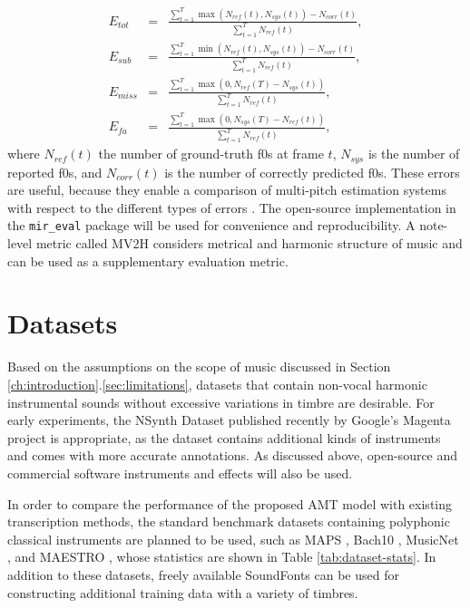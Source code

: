 \begin{eqnarray}
E_{tot} & = & \frac{\sum_{t=1}^T \max ( N_{ref}(t), N_{sys}(t) ) - N_{corr}(t)}{\sum_{t=1}^T N_{ref}(t)}, \\
E_{sub} & = & \frac{\sum_{t=1}^T \min ( N_{ref}(t), N_{sys}(t) ) - N_{corr}(t)}{\sum_{t=1}^T N_{ref}(t)}, \\
E_{miss} & = & \frac{\sum_{t=1}^T \max ( 0, N_{ref}(T) - N_{sys}(t) )}{\sum_{t=1}^T N_{ref}(t)}, \\
E_{fa} & = &  \frac{\sum_{t=1}^T \max ( 0, N_{sys}(T) - N_{ref}(t) )}{\sum_{t=1}^T N_{ref}(t)},
\end{eqnarray}
where $N_{ref}(t)$ the number of ground-truth f0s at frame $t$, $N_{sys}$ is the number of reported f0s, and $N_{corr}(t)$ is the number of correctly predicted f0s.
These errors are useful, because they enable a comparison of multi-pitch estimation systems with respect to the different types of errors \cite{bay2009evaluation}.
The open-source implementation in the \texttt{mir\_eval} package \cite{raffel2014mir_eval} will be used for convenience and reproducibility.
A note-level metric called MV2H \cite{mcleod2018eval} considers metrical and harmonic structure of music and can be used as a supplementary evaluation metric.





\section{Datasets}

Based on the assumptions on the scope of music discussed in Section \ref{ch:introduction}.\ref{sec:limitations}, datasets that contain non-vocal harmonic instrumental sounds without excessive variations in timbre are desirable.
For early experiments, the NSynth Dataset published recently by Google's Magenta project \cite{engel2017nsynth} is appropriate, as the dataset contains additional kinds of instruments and comes with more accurate annotations.
As discussed above, open-source and commercial software instruments and effects will also be used.

In order to compare the performance of the proposed AMT model with existing transcription methods, the standard benchmark datasets containing polyphonic classical instruments are planned to be used, such as MAPS \cite{emiya2010smoothness}, Bach10 \cite{duan2010bach10}, MusicNet \cite{thickstun2017musicnet}, and MAESTRO \cite{hawthorne2018maestro}, whose statistics are shown in Table \ref{tab:dataset-stats}.
In addition to these datasets, freely available SoundFonts can be used for constructing additional training data with a variety of timbres.


